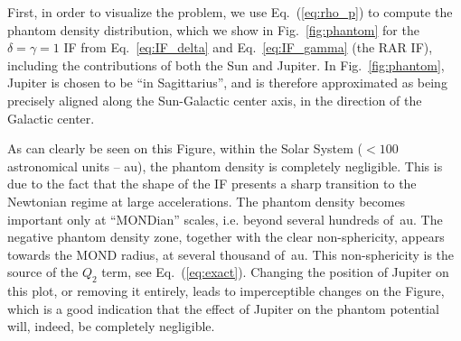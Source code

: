 \documentclass[reprint,nofootinbib,prd,aps]{revtex4-2}
\begin{document}
First, in order to visualize the problem, we use Eq.~(\ref{eq:rho_p}) to compute the phantom density distribution, which we show in Fig.~\ref{fig:phantom} for the $\delta=\gamma=1$ IF from Eq.~\eqref{eq:IF_delta} and Eq.~\eqref{eq:IF_gamma} (the RAR IF), including the contributions of both the Sun and Jupiter. In Fig.~\ref{fig:phantom}, Jupiter is chosen to be ``in Sagittarius'', and is therefore approximated as being precisely aligned along the Sun-Galactic center axis, in the direction of the Galactic center. 

As can clearly be seen on this Figure, within the Solar System ($< 100$ astronomical units -- au), the phantom density is completely negligible. This is due to the fact that the shape of the IF presents a sharp transition to the Newtonian regime at large accelerations. The phantom density becomes important only at ``MONDian'' scales, i.e. beyond several hundreds of~au. The negative phantom density zone, together with the clear non-sphericity, appears towards the MOND radius, at several thousand of~au. This non-sphericity is the source of the $Q_2$ term, see Eq.~(\ref{eq:exact}). Changing the position of Jupiter on this plot, or removing it entirely, leads to imperceptible changes on the Figure, which is a good indication that the effect of Jupiter on the phantom potential will, indeed, be completely negligible.
\end{document}
